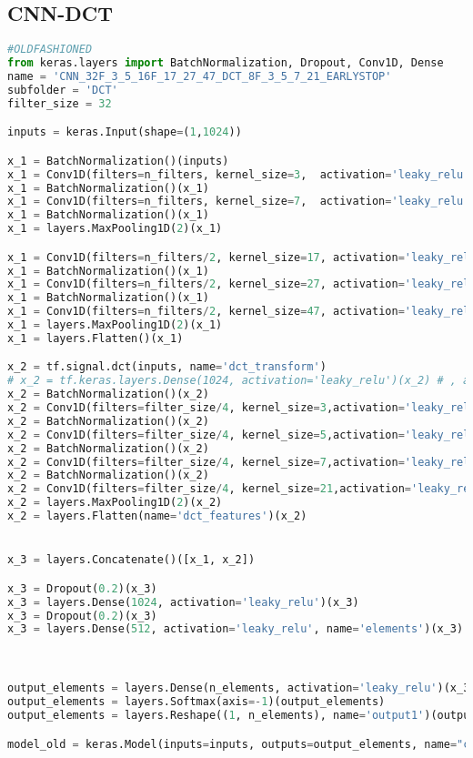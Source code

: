 \hypertarget{cnn-dct}{%
\subsection{CNN-DCT}\label{cnn-dct}}

\begin{lstlisting}[language=Python]
#OLDFASHIONED
from keras.layers import BatchNormalization, Dropout, Conv1D, Dense
name = 'CNN_32F_3_5_16F_17_27_47_DCT_8F_3_5_7_21_EARLYSTOP'
subfolder = 'DCT'
filter_size = 32

inputs = keras.Input(shape=(1,1024))

x_1 = BatchNormalization()(inputs)
x_1 = Conv1D(filters=n_filters, kernel_size=3,  activation='leaky_relu', data_format='channels_first')(x_1)
x_1 = BatchNormalization()(x_1)
x_1 = Conv1D(filters=n_filters, kernel_size=7,  activation='leaky_relu', data_format='channels_first')(x_1)
x_1 = BatchNormalization()(x_1)
x_1 = layers.MaxPooling1D(2)(x_1)

x_1 = Conv1D(filters=n_filters/2, kernel_size=17, activation='leaky_relu', data_format='channels_first')(x_1)
x_1 = BatchNormalization()(x_1)
x_1 = Conv1D(filters=n_filters/2, kernel_size=27, activation='leaky_relu', data_format='channels_first')(x_1)
x_1 = BatchNormalization()(x_1)
x_1 = Conv1D(filters=n_filters/2, kernel_size=47, activation='leaky_relu', data_format='channels_first')(x_1)
x_1 = layers.MaxPooling1D(2)(x_1)
x_1 = layers.Flatten()(x_1)

x_2 = tf.signal.dct(inputs, name='dct_transform')
# x_2 = tf.keras.layers.Dense(1024, activation='leaky_relu')(x_2) # , activity_regularizer='l1'
x_2 = BatchNormalization()(x_2)
x_2 = Conv1D(filters=filter_size/4, kernel_size=3,activation='leaky_relu', data_format='channels_first')(x_2)
x_2 = BatchNormalization()(x_2)
x_2 = Conv1D(filters=filter_size/4, kernel_size=5,activation='leaky_relu', data_format='channels_first')(x_2)
x_2 = BatchNormalization()(x_2)
x_2 = Conv1D(filters=filter_size/4, kernel_size=7,activation='leaky_relu', data_format='channels_first')(x_2)
x_2 = BatchNormalization()(x_2)
x_2 = Conv1D(filters=filter_size/4, kernel_size=21,activation='leaky_relu',data_format='channels_first')(x_2)
x_2 = layers.MaxPooling1D(2)(x_2)
x_2 = layers.Flatten(name='dct_features')(x_2)


x_3 = layers.Concatenate()([x_1, x_2])

x_3 = Dropout(0.2)(x_3)
x_3 = layers.Dense(1024, activation='leaky_relu')(x_3)
x_3 = Dropout(0.2)(x_3)
x_3 = layers.Dense(512, activation='leaky_relu', name='elements')(x_3)



output_elements = layers.Dense(n_elements, activation='leaky_relu')(x_3)
output_elements = layers.Softmax(axis=-1)(output_elements)
output_elements = layers.Reshape((1, n_elements), name='output1')(output_elements)

model_old = keras.Model(inputs=inputs, outputs=output_elements, name="cnn_dct")
\end{lstlisting}

